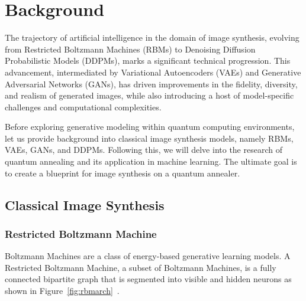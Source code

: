 \documentclass[technologies,article,accept,pdftex,moreauthors]{Definitions/mdpi}
\newcommand{\figref}[1]{Figure~\ref{#1}}
\begin{document}
\section{Background}
The trajectory of artificial intelligence in the domain of image synthesis, evolving from Restricted Boltzmann Machines (RBMs) to Denoising Diffusion Probabilistic Models (DDPMs), marks a significant technical progression. This advancement, intermediated by Variational Autoencoders (VAEs) and Generative Adversarial Networks (GANs), has driven improvements in the fidelity, diversity, and realism of generated images, while also introducing a host of model-specific challenges and computational complexities.


Before exploring generative modeling within quantum computing environments, let us provide background into classical image synthesis models, namely RBMs, VAEs, GANs, and DDPMs. Following this, we will delve into the research of quantum annealing and its application in machine learning. The ultimate goal is to create a blueprint for image synthesis on a quantum annealer.

\subsection{Classical Image Synthesis}
\subsubsection{Restricted Boltzmann Machine}
Boltzmann Machines are a class of energy-based generative learning models. A Restricted Boltzmann Machine, a subset of Boltzmann Machines, is a fully connected bipartite graph that is segmented into visible and hidden neurons as shown in \figref{fig:rbmarch}~\cite{Jain2020}.
\end{document}
